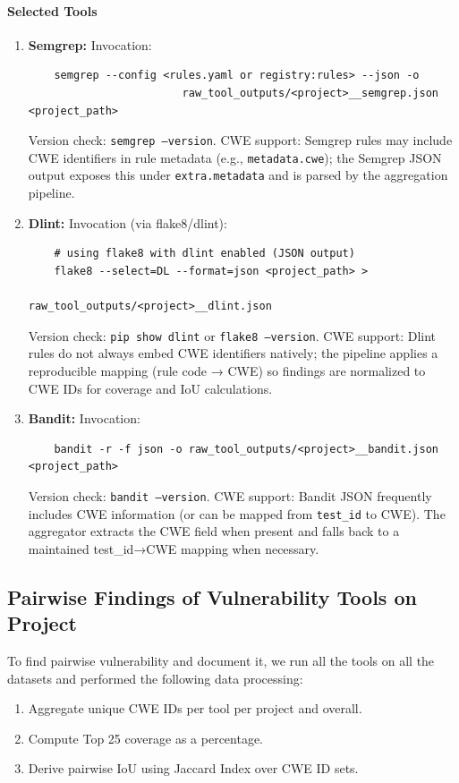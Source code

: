 \paragraph{Selected Tools}
\begin{enumerate}
    \item \textbf{Semgrep:} Invocation:
    \begin{verbatim}
    semgrep --config <rules.yaml or registry:rules> --json -o 
                        raw_tool_outputs/<project>__semgrep.json <project_path>
    \end{verbatim}
    Version check: \texttt{semgrep --version}.  
    CWE support: Semgrep rules may include CWE identifiers in rule metadata (e.g., \texttt{metadata.cwe}); the Semgrep JSON output exposes this under \texttt{extra.metadata} and is parsed by the aggregation pipeline.

    \item \textbf{Dlint:} Invocation (via flake8/dlint):
    \begin{verbatim}
    # using flake8 with dlint enabled (JSON output)
    flake8 --select=DL --format=json <project_path> > 
                                raw_tool_outputs/<project>__dlint.json
    \end{verbatim}
    Version check: \texttt{pip show dlint} or \texttt{flake8 --version}.  
    CWE support: Dlint rules do not always embed CWE identifiers natively; the pipeline applies a reproducible mapping (rule code → CWE) so findings are normalized to CWE IDs for coverage and IoU calculations.

    \item \textbf{Bandit:} Invocation:
    \begin{verbatim}
    bandit -r -f json -o raw_tool_outputs/<project>__bandit.json <project_path>
    \end{verbatim}
    Version check: \texttt{bandit --version}.  
    CWE support: Bandit JSON frequently includes CWE information (or can be mapped from \texttt{test\_id} to CWE). The aggregator extracts the CWE field when present and falls back to a maintained test\_id→CWE mapping when necessary.
\end{enumerate}

\subsection{Pairwise Findings of Vulnerability Tools on Project}


To find pairwise vulnerability and document it, we run all the tools on all the datasets and performed the following data processing:
\begin{enumerate}
    \item Aggregate unique CWE IDs per tool per project and overall. 
    \item Compute Top 25 coverage as a percentage. 
    \item Derive pairwise IoU using Jaccard Index over CWE ID sets. 
\end{enumerate}

